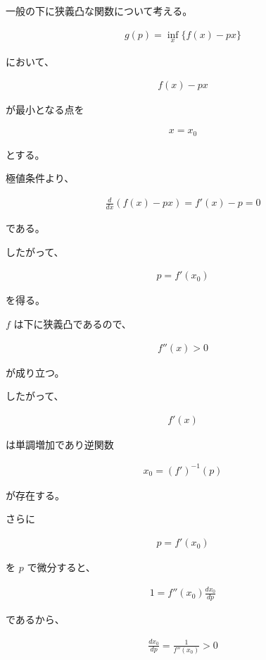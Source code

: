\documentclass[platex,dvipdfmx,a4paper]{jsarticle}
\begin{document}
一般の下に狭義凸な関数について考える。

\begin{align*}
g(p)
=
\inf_x
\{f(x)-px\}
\end{align*}

において、

\begin{align*}
f(x)-px
\end{align*}

が最小となる点を

\begin{align*}
x=x_0
\end{align*}

とする。

極値条件より、

\begin{align*}
\frac{d}{dx}
\left(
f(x)-px
\right)
=
f'(x)-p
=
0
\end{align*}

である。

したがって、

\begin{align*}
p=f'(x_0)
\end{align*}

を得る。

$f$ は下に狭義凸であるので、

\begin{align*}
f''(x)>0
\end{align*}

が成り立つ。

したがって、

\begin{align*}
f'(x)
\end{align*}

は単調増加であり逆関数

\begin{align*}
x_0=(f')^{-1}(p)
\end{align*}

が存在する。

さらに

\begin{align*}
p=f'(x_0)
\end{align*}

を $p$ で微分すると、

\begin{align*}
1
=
f''(x_0)
\frac{dx_0}{dp}
\end{align*}

であるから、

\begin{align*}
\frac{dx_0}{dp}
=
\frac{1}{f''(x_0)}
>
0
\end{align*}
\end{document}

